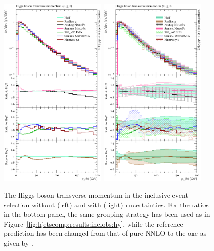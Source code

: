 \begin{figure}[t!]
  \centering
  \includegraphics[width=0.47\textwidth]{figures/hjetscomp_u_H_pT_incl.pdf}
  \hfill
  \includegraphics[width=0.47\textwidth]{figures/hjetscomp_H_pT_incl.pdf}
  \caption{\label{fig:hjetscomp:results:inclobs:hpt}%
    The Higgs boson transverse momentum in the inclusive event
    selection without (left) and with (right) uncertainties. For the
    ratios in the bottom panel, the same grouping strategy has been
    used as in Figure~\ref{fig:hjetscomp:results:inclobs:hy}, while
    the reference prediction has been changed from that of pure NNLO
    to the one as given by \HqT.}
\end{figure}

